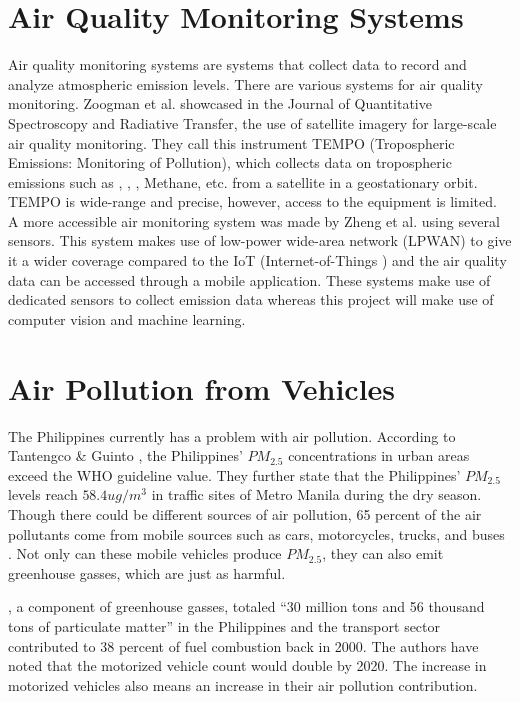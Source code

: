 \section{Air Quality Monitoring Systems}
Air quality monitoring systems are systems that collect data to record and analyze atmospheric emission levels. There are various systems for air quality monitoring. Zoogman et al.\citeyear{zoogman_2017} showcased in the Journal of Quantitative Spectroscopy and Radiative Transfer, the use of satellite imagery for large-scale air quality monitoring. They call this instrument TEMPO (Tropospheric Emissions: Monitoring of Pollution), which collects data on tropospheric emissions such as , , , Methane, etc. from a satellite in a geostationary orbit. TEMPO is wide-range and precise,  however, access to the equipment is limited.  A more accessible air monitoring system was made by Zheng et al. \citeyear{zheng_2016} using several sensors. This system makes use of low-power wide-area network (LPWAN) to give it a wider coverage compared to the IoT (Internet-of-Things ) and the air quality data can be accessed through a mobile application. These systems make use of dedicated sensors to collect emission data whereas this project will make use of computer vision and machine learning.


\section{Air Pollution from Vehicles}
The Philippines currently has a problem with air pollution. According to Tantengco \& Guinto \citeyear{TANTENGCO2022}, the Philippines’ $PM_{2.5}$ concentrations in urban areas exceed the WHO guideline value. They further state that the Philippines’ $PM_{2.5}$ levels reach $58.4 ug/m^{3}$ in traffic sites of Metro Manila during the dry season. Though there could be different sources of air pollution, 65 percent of the air pollutants come from mobile sources such as cars, motorcycles, trucks, and buses \cite{EMB_2015}. Not only can these mobile vehicles produce $PM_{2.5}$, they can also emit greenhouse gasses, which are just as harmful.

	, a component of greenhouse gasses, totaled “30 million tons and 56 thousand tons of particulate matter” \cite{FabianGota2009} in the Philippines and the transport sector contributed to 38 percent of fuel combustion back in 2000. The authors have noted that the motorized vehicle count would double by 2020. The increase in motorized vehicles also means an increase in their air pollution contribution. 

